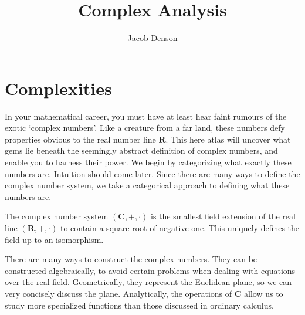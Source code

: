 

\title{Complex Analysis}
\author{Jacob Denson}



\maketitle
\tableofcontents
{}

\chapter{Complexities}

In your mathematical career, you must have at least hear faint rumours of the exotic `complex numbers'. Like a creature from a far land, these numbers defy properties obvious to the real number line $\mathbf{R}$. This here atlas will uncover what gems lie beneath the seemingly abstract definition of complex numbers, and enable you to harness their power. We begin by categorizing what exactly these numbers are. Intuition should come later. Since there are many ways to define the complex number system, we take a categorical approach to defining what these numbers are.

\begin{definition}
    The complex number system $(\mathbf{C},+,\cdot)$ is the smallest field extension of the real line $(\mathbf{R}, +, \cdot)$ to contain a square root of negative one. This uniquely defines the field up to an isomorphism.
\end{definition}

There are many ways to construct the complex numbers. They can be constructed algebraically, to avoid certain problems when dealing with equations over the real field. Geometrically, they represent the Euclidean plane, so we can very concisely discuss the plane. Analytically, the operations of $\mathbf{C}$ allow us to study more specialized functions than those discussed in ordinary calculus.


